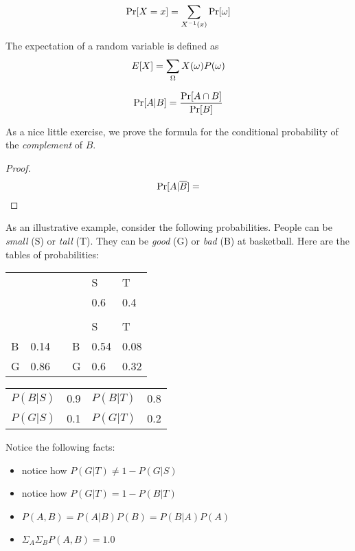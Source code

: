 $$ \operatorname{Pr}[X=x] = \sum_{X^{-1}(x)} \operatorname{Pr}[\omega] $$

\begin{definition}[Expectation]
    The expectation of a random variable is defined as 
    $$ E[X] = \sum_{\Omega} X(\omega)P(\omega)$$ 
\end{definition}

\begin{definition}
    $$ \operatorname{Pr}[A | B] = \frac{\operatorname{Pr}[A \cap B]}{\operatorname{Pr}[B]}$$
\end{definition}

As a nice little exercise, we prove the formula for the conditional probability of the \emph{complement} of $B$.

\begin{proof}
    $$ \operatorname{Pr}[A | \overline{B}] = $$
\end{proof}



As an illustrative example, consider the following probabilities. People can be \emph{small} (S) or \emph{tall} (T). They can be \emph{good} (G) or \emph{bad} (B) at basketball.
Here are the tables of probabilities:

\begin{table}[H]
    \centering
    \begin{tabular}{llllll}
      &      &  &   & S    & T    \\
      &      &  &   & 0.6  & 0.4  \\
      &      &  &   &      &      \\
      &      &  &   & S    & T    \\
    B & 0.14 &  & B & 0.54 & 0.08 \\
    G & 0.86 &  & G & 0.6  & 0.32
    \end{tabular}
\end{table}

\begin{table}[H]
    \centering
    \begin{tabular}{llll}
        $P(B|S)$ & 0.9 & $P(B|T)$ & 0.8 \\
        $P(G|S)$ & 0.1 & $P(G|T)$ & 0.2 
    \end{tabular}
\end{table}

Notice the following facts:
\begin{itemize}
    \item notice how $P(G|T) \neq 1 - P(G|S)$
    \item notice how $P(G|T) = 1 - P(B|T)$
    \item $P(A, B) = P(A|B) P(B) = P(B|A) P(A)$
    \item $ \Sigma_A \Sigma_B P(A, B) = 1.0 $
\end{itemize}


